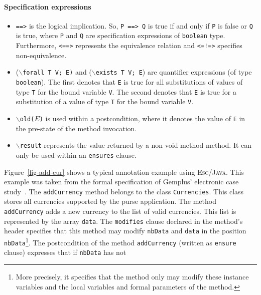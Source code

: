 \documentclass[a4paper]{llncs}
\newcommand{\escj}{\textsc{Esc/Java}}
\begin{document}
 
 
\paragraph{\bf Specification expressions} 
\begin{itemize} 
\item{\texttt{==>}} is the logical implication. So, \texttt{P 
==> Q} is true if and only if \texttt{P} is false or \texttt{Q} is 
true, where \texttt{P} and \texttt{Q} are specification expressions of  
\texttt{boolean} type. Furthermore, \texttt{<==>} represents the 
equivalence relation and \texttt{<=!=>} specifies non-equivalence. 
 
\item {($\backslash$\texttt{forall T V; E)} and 
($\backslash$\texttt{exists T V; E})} are quantifier expressions (of 
type \texttt{boolean}).  The first denotes that \texttt{E} is true 
for all substitutions of values of type \texttt{T} for the bound 
variable \texttt{V}. The second denotes that \texttt{E} is true 
for a substitution of a value of type \texttt{T} for the bound 
variable \texttt{V}. 
 
\item{\texttt{$\backslash$old($E$)}} is used within a postcondition, where it
denotes the value of \texttt{E} in the pre-state of the method invocation. 
 
\item {\tt$\backslash$result} represents the value returned by 
a non-void method method. It can only be used within an 
\texttt{ensures} clause. 
\end{itemize} 
Figure~\ref{fig-add-cur} shows a typical annotation example using 
\escj. This example was taken from the formal specification of
Gemplus' electronic case study~\cite{CH01Url}. The \texttt{addCurrency}
method belongs
to the class \texttt{Currencies}. This class stores all currencies 
supported by the purse application. The method 
\texttt{addCurrency} adds a new currency to the list of valid 
currencies. This list is represented by the 
array \texttt{data}. The \texttt{modifies} clause declared in the 
method's header specifies that 
this method may modify \texttt{nbData} and 
\texttt{data} in the position \texttt{nbData}\footnote{More precisely,
it specifies that the method only may modify these instance variables
and the local variables and formal parameters of the method.}. The
postcondition of the method \texttt{addCurrency} (written as 
\texttt{ensure} clause) expresses that if \texttt{nbData} has not 
\end{document}

